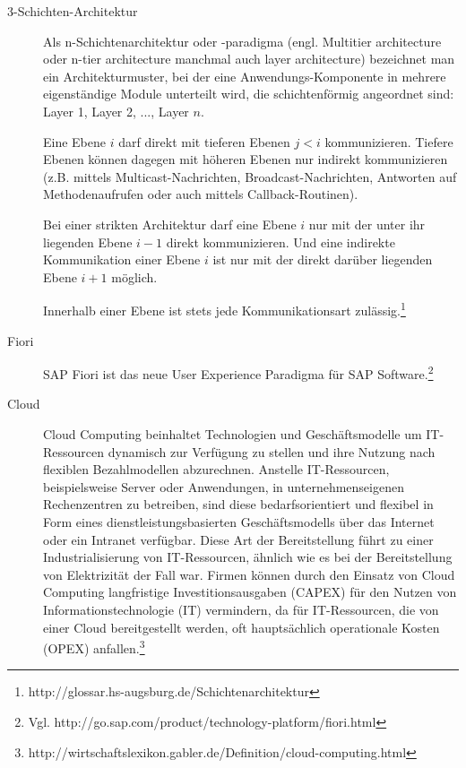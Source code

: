
    \begin{description}
    
        \item[3-Schichten-Architektur] Als n-Schichtenarchitektur oder -paradigma (engl. Multitier architecture oder n-tier architecture manchmal auch layer architecture) bezeichnet man ein Architekturmuster, bei der eine Anwendungs-Komponente in mehrere eigenständige Module unterteilt wird, die schichtenförmig angeordnet sind: Layer 1, Layer 2, ..., Layer $n$.

            Eine Ebene $i$ darf direkt mit tieferen Ebenen $j<i$ kommunizieren. Tiefere Ebenen können dagegen mit höheren Ebenen nur indirekt kommunizieren (z.B. mittels Multicast-Nachrichten, Broadcast-Nachrichten, Antworten auf Methodenaufrufen oder auch mittels Callback-Routinen).

            Bei einer strikten Architektur darf eine Ebene $i$ nur mit der unter ihr liegenden Ebene $i-1$ direkt kommunizieren. Und eine indirekte Kommunikation einer Ebene $i$ ist nur mit der direkt darüber liegenden Ebene $i+1$ möglich.

            Innerhalb einer Ebene ist stets jede Kommunikationsart zulässig.\footnote{http://glossar.hs-augsburg.de/Schichtenarchitektur}
        
        \item[Fiori] SAP Fiori ist das neue User Experience Paradigma für SAP Software.\footnote{Vgl. http://go.sap.com/product/technology-platform/fiori.html} 
    
        \item[Cloud] Cloud Computing beinhaltet Technologien und Geschäftsmodelle um IT-Ressourcen dynamisch zur Verfügung zu stellen und ihre Nutzung nach flexiblen Bezahlmodellen abzurechnen. Anstelle IT-Ressourcen, beispielsweise Server oder Anwendungen, in unternehmenseigenen Rechenzentren zu betreiben, sind diese bedarfsorientiert und flexibel in Form eines dienstleistungsbasierten Geschäftsmodells über das Internet oder ein Intranet verfügbar. Diese Art der Bereitstellung führt zu einer Industrialisierung von IT-Ressourcen, ähnlich wie es bei der Bereitstellung von Elektrizität der Fall war. Firmen können durch den Einsatz von Cloud Computing langfristige Investitionsausgaben (CAPEX) für den Nutzen von Informationstechnologie (IT) vermindern, da für IT-Ressourcen, die von einer Cloud bereitgestellt werden, oft hauptsächlich operationale Kosten (OPEX) anfallen.\footnote{http://wirtschaftslexikon.gabler.de/Definition/cloud-computing.html}


\end{description}
